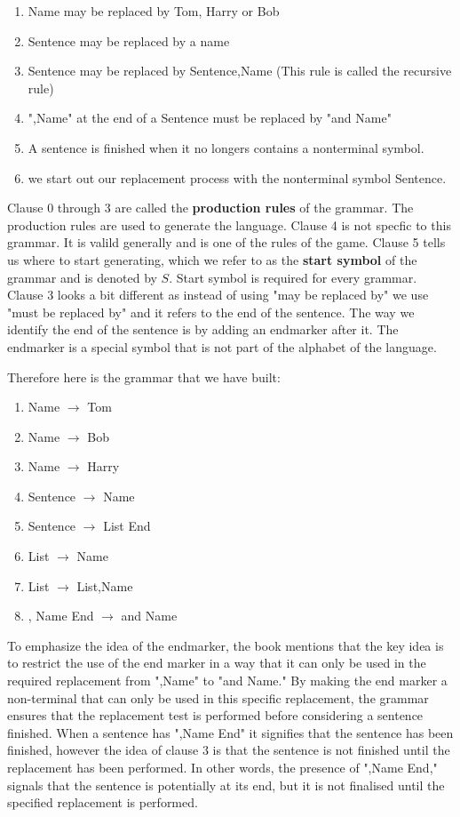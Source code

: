 \begin{enumerate}
    \item Name may be replaced by Tom, Harry or Bob
    \item Sentence may be replaced by a name
    \item Sentence may be replaced by Sentence,Name (This rule is called the recursive rule)
    \item ",Name" at the end of a Sentence must be replaced by "and Name"
    \item A sentence is finished when it no longers contains a nonterminal symbol. 
    \item we start out our replacement process with the nonterminal symbol Sentence.
\end{enumerate}

Clause 0 through 3 are called the \textbf{production rules} of the grammar. The production rules are used to generate the language.
Clause 4 is not specfic to this grammar. It is valild generally and is one of the rules of the game. Clause 5 tells us where to start generating, which we refer to as the \textbf{start symbol} of the grammar and is denoted by $S$.
Start symbol is required for every grammar. Clause 3 looks a bit different as instead of using "may be replaced by" we use "must be replaced by" and it refers to the end of the sentence. 
The way we identify the end of the sentence is by adding an endmarker after it. The endmarker is a special symbol that is not part of the alphabet of the language.

Therefore here is the grammar that we have built:
\begin{enumerate}
    \item Name $\rightarrow$ Tom
    \item Name $\rightarrow$ Bob
    \item Name $\rightarrow$ Harry
    \item Sentence $\rightarrow$ Name
    \item Sentence $\rightarrow$ List End
    \item List $\rightarrow$ Name
    \item List $\rightarrow$ List,Name
    \item , Name End $\rightarrow$ and Name
\end{enumerate}

To emphasize the idea of the endmarker, the book mentions that the key idea is to restrict the use of the end marker in a way that it can only be used in the required replacement from ",Name" to "and Name."
By making the end marker a non-terminal that can only be used in this specific replacement, the grammar ensures that the replacement test is performed before considering a sentence finished.
When a sentence has ",Name End" it signifies that the sentence has been finished, however the idea of clause 3 is that the sentence is not finished until the replacement has been performed. 
In other words, the presence of ",Name End," signals that the sentence is potentially at its end, but it is not finalised until the specified replacement is performed. 

